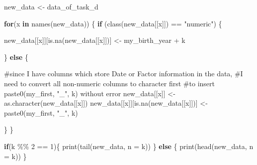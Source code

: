 \documentclass[
  letterpaper,
  DIV=11,
  numbers=noendperiod]{scrartcl}
\newenvironment{Shaded}{\begin{snugshade}}{\end{snugshade}}
\newcommand{\AttributeTok}[1]{\textcolor[rgb]{0.40,0.45,0.13}{#1}}
\newcommand{\CommentTok}[1]{\textcolor[rgb]{0.37,0.37,0.37}{#1}}
\newcommand{\ControlFlowTok}[1]{\textcolor[rgb]{0.00,0.23,0.31}{\textbf{#1}}}
\newcommand{\DecValTok}[1]{\textcolor[rgb]{0.68,0.00,0.00}{#1}}
\newcommand{\FunctionTok}[1]{\textcolor[rgb]{0.28,0.35,0.67}{#1}}
\newcommand{\NormalTok}[1]{\textcolor[rgb]{0.00,0.23,0.31}{#1}}
\newcommand{\OtherTok}[1]{\textcolor[rgb]{0.00,0.23,0.31}{#1}}
\newcommand{\SpecialCharTok}[1]{\textcolor[rgb]{0.37,0.37,0.37}{#1}}
\newcommand{\StringTok}[1]{\textcolor[rgb]{0.13,0.47,0.30}{#1}}
\begin{document}
\begin{Shaded}
\begin{Highlighting}[]
\NormalTok{new\_data }\OtherTok{\textless{}{-}}\NormalTok{ data\_of\_task\_d}

\ControlFlowTok{for}\NormalTok{(x }\ControlFlowTok{in} \FunctionTok{names}\NormalTok{(new\_data)) \{}
  \ControlFlowTok{if}\NormalTok{ (}\FunctionTok{class}\NormalTok{(new\_data[[x]]) }\SpecialCharTok{==} \StringTok{"numeric"}\NormalTok{) \{}
    
\NormalTok{    new\_data[[x]][}\FunctionTok{is.na}\NormalTok{(new\_data[[x]])] }\OtherTok{\textless{}{-}}\NormalTok{ my\_birth\_year }\SpecialCharTok{+}\NormalTok{ k}
    
\NormalTok{  \} }\ControlFlowTok{else}\NormalTok{ \{}
    
    \CommentTok{\#since I have columns which store Date or Factor information in the data,}
    \CommentTok{\#I need to convert all non{-}numeric columns to character first}
    \CommentTok{\#to insert paste0(my\_first, "\_", k) without error}
\NormalTok{    new\_data[[x]] }\OtherTok{\textless{}{-}} \FunctionTok{as.character}\NormalTok{(new\_data[[x]]) }
\NormalTok{    new\_data[[x]][}\FunctionTok{is.na}\NormalTok{(new\_data[[x]])] }\OtherTok{\textless{}{-}} \FunctionTok{paste0}\NormalTok{(my\_first, }\StringTok{"\_"}\NormalTok{, k)}
    
\NormalTok{  \}}
\NormalTok{\}}

\ControlFlowTok{if}\NormalTok{(k }\SpecialCharTok{\%\%} \DecValTok{2} \SpecialCharTok{==} \DecValTok{1}\NormalTok{)\{}
  \FunctionTok{print}\NormalTok{(}\FunctionTok{tail}\NormalTok{(new\_data, }\AttributeTok{n =}\NormalTok{ k))}
\NormalTok{\} }\ControlFlowTok{else}\NormalTok{ \{}
  \FunctionTok{print}\NormalTok{(}\FunctionTok{head}\NormalTok{(new\_data, }\AttributeTok{n =}\NormalTok{ k))}
\NormalTok{\}}
\end{Highlighting}
\end{Shaded}
\end{document}
